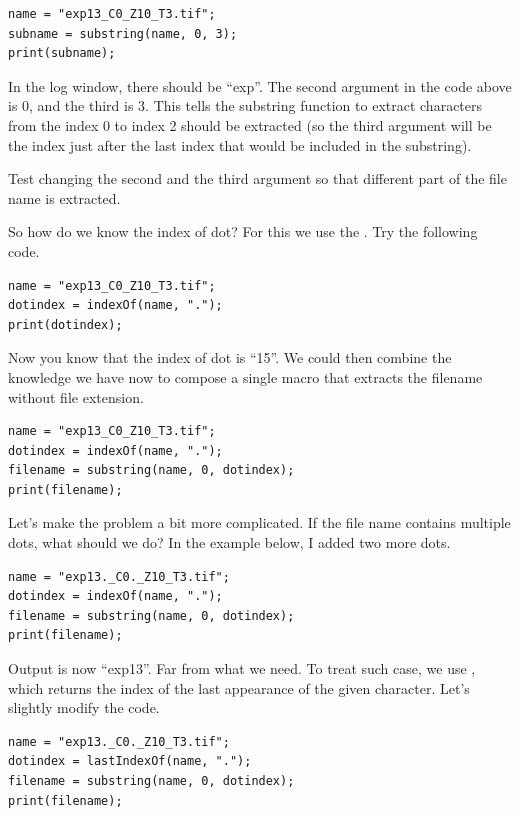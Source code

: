 \begin{lstlisting}
name = "exp13_C0_Z10_T3.tif";
subname = substring(name, 0, 3);
print(subname);
\end{lstlisting}

In the log window, there should be ``exp''. The second argument in the code above is 0, and the third is 3. This tells the substring function to extract characters from the index 0 to index 2 should be extracted (so the third argument will be the index just after the last index that would be included in the substring). 

\begin{indentexercise}{1}
Test changing the second and the third argument so that different part of the file name is extracted. 
\end{indentexercise}

So how do we know the index of dot? For this we use the . Try the following code. 

\begin{lstlisting}
name = "exp13_C0_Z10_T3.tif";
dotindex = indexOf(name, ".");
print(dotindex);
\end{lstlisting}

Now you know that the index of dot is ``15''. We could then combine the knowledge we have now to compose a single macro that extracts the filename without file extension. 

\begin{lstlisting}
name = "exp13_C0_Z10_T3.tif";
dotindex = indexOf(name, ".");
filename = substring(name, 0, dotindex);
print(filename);
\end{lstlisting}

Let's make the problem a bit more complicated. If the file name contains multiple dots, what should we do? In the example below, I added two more dots. 

\begin{lstlisting}
name = "exp13._C0._Z10_T3.tif";
dotindex = indexOf(name, ".");
filename = substring(name, 0, dotindex);
print(filename);
\end{lstlisting}

Output is now ``exp13''. Far from what we need. To treat such case, we use , which returns the index of the last appearance of the given character. Let's slightly modify the code. 

\begin{lstlisting}
name = "exp13._C0._Z10_T3.tif";
dotindex = lastIndexOf(name, ".");
filename = substring(name, 0, dotindex);
print(filename);
\end{lstlisting}

